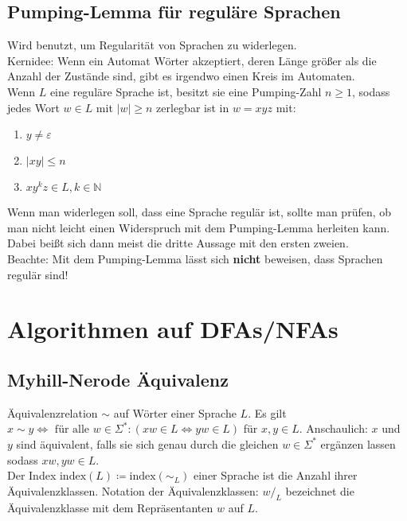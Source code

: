 \documentclass[11pt]{scrartcl}
\begin{document}
\subsection{Pumping-Lemma für reguläre Sprachen}

Wird benutzt, um Regularität von Sprachen zu widerlegen. \\

Kernidee: Wenn ein Automat Wörter akzeptiert, deren Länge größer als die Anzahl der Zustände sind, gibt es irgendwo einen Kreis im Automaten. \\

Wenn $L$ eine reguläre Sprache ist, besitzt sie eine Pumping-Zahl $n \geq 1$, sodass jedes Wort $w \in L$ mit $\vert w\vert \geq n$ zerlegbar ist in $w = xyz$ mit:
\begin{enumerate}
	\item{$y \neq \varepsilon$}
	\item{$|xy| \leq n$}
	\item{$xy^kz \in L, k \in \mathbb{N}$}
\end{enumerate}

Wenn man widerlegen soll, dass eine Sprache regulär ist, sollte man prüfen, ob man nicht leicht einen Widerspruch mit dem Pumping-Lemma herleiten kann. Dabei beißt sich dann meist die dritte Aussage mit den ersten zweien. \\

Beachte: Mit dem Pumping-Lemma lässt sich \textbf{nicht} beweisen, dass Sprachen regulär sind!

\section{Algorithmen auf DFAs/NFAs}

\subsection{Myhill-Nerode Äquivalenz}
Äquivalenzrelation $\sim$ auf Wörter einer Sprache $L$. Es gilt $x \sim y \Leftrightarrow \text{ für alle } w \in \Sigma^*: (xw \in L \Leftrightarrow yw \in L)$ für $x,y \in L$. Anschaulich: $x$ und $y$ sind äquivalent, falls sie sich genau durch die gleichen $w \in \Sigma^*$ ergänzen lassen sodass $xw, yw \in L$. \\

Der Index $\textrm{index}(L) \coloneqq \textrm{index}(\sim_L)$ einer Sprache ist die Anzahl ihrer Äquivalenzklassen. Notation der Äquivalenzklassen: $w/_L$ bezeichnet die Äquivalenzklasse mit dem Repräsentanten $w$ auf $L$. \\
\end{document}

